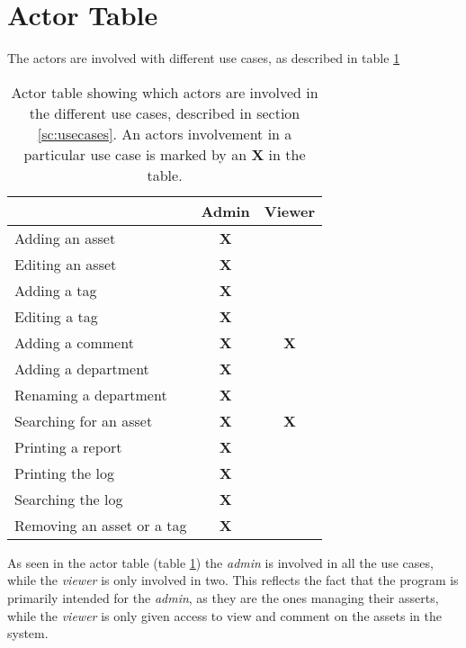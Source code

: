 \section{Actor Table}\label{sc:actortable}

The actors are involved with different use cases, as described in table \ref{tab:actortable}

\begin{table}[H]
    \centering
    \begin{tabular}{|l|c|c|}
        \hline
         & \textbf{Admin} & \textbf{Viewer}  \\
        \hline
        Adding an asset & \textbf{X} & \\
        \hline
        Editing an asset & \textbf{X} & \\
        \hline
        Adding a tag & \textbf{X} & \\
        \hline
        Editing a tag & \textbf{X} & \\
        \hline
        Adding a comment & \textbf{X} & \textbf{X} \\
        \hline
        Adding a department & \textbf{X} & \\
        \hline
        Renaming a department & \textbf{X} & \\
        \hline
        Searching for an asset & \textbf{X} & \textbf{X} \\
        \hline
        Printing a report & \textbf{X} & \\
        \hline
        Printing the log & \textbf{X} & \\
        \hline
        Searching the log & \textbf{X} & \\
        \hline
        Removing an asset or a tag & \textbf{X} & \\
        \hline
        
    \end{tabular}
    \caption{Actor table showing which actors are involved in the different use cases, described in section \ref{sc:usecases}. An actors involvement in a particular use case is marked by an \textbf{X} in the table.}
    \label{tab:actortable}
\end{table}

As seen in the actor table (table \ref{tab:actortable}) the \textit{admin} is involved in all the use cases, while the \textit{viewer} is only involved in two. This reflects the fact that the program is primarily intended for the \textit{admin}, as they are the ones managing their asserts, while the \textit{viewer} is only given access to view and comment on the assets in the system. 
